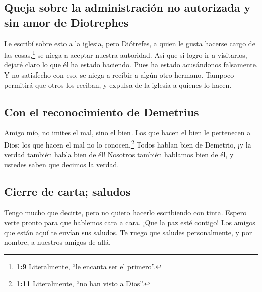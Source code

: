 \hypertarget{queja-sobre-la-administraciuxf3n-no-autorizada-y-sin-amor-de-diotrephes}{%
\subsection{Queja sobre la administración no autorizada y sin amor de
Diotrephes}\label{queja-sobre-la-administraciuxf3n-no-autorizada-y-sin-amor-de-diotrephes}}

 Le escribí sobre esto a la iglesia, pero Diótrefes, a
quien le gusta hacerse cargo de las cosas,\footnote{\textbf{1:9}
  Literalmente, ``le encanta ser el primero''.} se niega a aceptar
nuestra autoridad.  Así que si logro ir a visitarlos,
dejaré claro lo que él ha estado haciendo. Pues ha estado acusándonos
falsamente. Y no satisfecho con eso, se niega a recibir a algún otro
hermano. Tampoco permitirá que otros los reciban, y expulsa de la
iglesia a quienes lo hacen.

\hypertarget{con-el-reconocimiento-de-demetrius}{%
\subsection{Con el reconocimiento de
Demetrius}\label{con-el-reconocimiento-de-demetrius}}

 Amigo mío, no imites el mal, sino el bien. Los que hacen
el bien le pertenecen a Dios; los que hacen el mal no lo
conocen.\footnote{\textbf{1:11} Literalmente, ``no han visto a Dios''.}
 Todos hablan bien de Demetrio, ¡y la verdad también
habla bien de él! Nosotros también hablamos bien de él, y ustedes saben
que decimos la verdad.

\hypertarget{cierre-de-carta-saludos}{%
\subsection{Cierre de carta; saludos}\label{cierre-de-carta-saludos}}

 Tengo mucho que decirte, pero no quiero hacerlo
escribiendo con tinta.  Espero verte pronto para que
hablemos cara a cara. ¡Que la paz esté contigo! Los amigos que están
aquí te envían sus saludos. Te ruego que saludes personalmente, y por
nombre, a nuestros amigos de allá.
